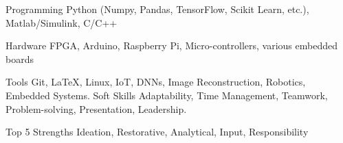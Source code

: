 

\begin{cvskills}

  \cvskill
    {Programming} %
    {Python (Numpy, Pandas, TensorFlow, Scikit Learn, etc.), Matlab/Simulink, C/C++} %

  \cvskill
    {Hardware} %
    {FPGA, Arduino, Raspberry Pi, Micro-controllers, various embedded boards} %

  \cvskill
    {Tools} %
    {Git, \LaTeX, Linux, IoT, DNNs, Image Reconstruction, Robotics, Embedded Systems.} %
  \cvskill
    {Soft Skills} %
    {Adaptability, Time Management, Teamwork, Problem-solving,  Presentation, Leadership.} %

  \cvskill
    {Top 5 Strengths} %
    {Ideation, Restorative,	Analytical,	Input, Responsibility} %

\end{cvskills}
